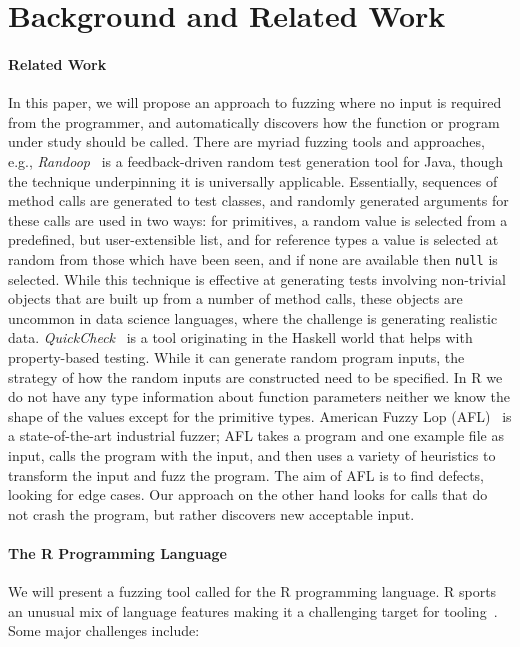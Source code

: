 \documentclass[sigplan,nonacm,anonymous,review]{acmart}
\begin{document}
\section{Background and Related Work}
\label{sec:background}

\paragraph{Related Work}

In this paper, we will propose an approach to fuzzing where no input is required from the programmer, and automatically discovers how the function or program under study should be called.
There are myriad fuzzing tools and approaches, e.g., \emph{Randoop}~\cite{pacheco2007randoop} is a feedback-driven random test generation tool for Java, though the technique underpinning it is universally applicable.
Essentially, sequences of method calls are generated to test classes, and randomly generated arguments for these calls are used in two ways: for primitives, a random value is selected from a predefined, but user-extensible list, and for reference types a value is selected at random from those which have been seen, and if none are available then {\tt null} is selected.
While this technique is effective at generating tests involving non-trivial objects that are built up from a number of method calls, these objects are uncommon in data science languages, where the challenge is generating realistic data.
\emph{QuickCheck}~\cite{quickcheck} is a tool originating in the Haskell world that helps with property-based testing.
While it can generate random program inputs, the strategy of how the random inputs are constructed need to be specified.
In R we do not have any type information about function parameters neither we know the shape of the values except for the primitive types.
American Fuzzy Lop (AFL)~\cite{afl} is a state-of-the-art industrial fuzzer; AFL takes a program and one example file as input, calls the program with the input, and then uses a variety of heuristics to transform the input and fuzz the program. The aim of AFL is to find defects, looking for edge cases.
Our approach on the other hand looks for calls that do not crash the program, but rather discovers new acceptable input.

\paragraph{The R Programming Language}

We will present a fuzzing tool called \tool for the R programming language.
R sports an unusual mix of language features making it a challenging target for
tooling~\cite{morandat2012evaluating}. 
Some major challenges include:
\end{document}
